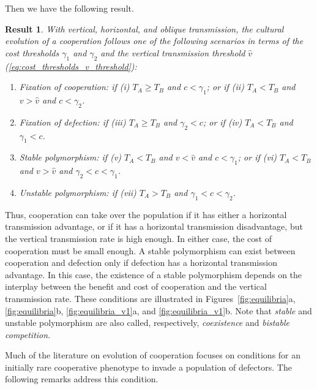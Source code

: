 \documentclass[12pt]{extarticle}
\newtheorem{result}{Result}
\begin{document}
Then we have the following result.
\\

\begin{result}%
\label{result:vert_obli_hori}
With vertical, horizontal, and oblique transmission, the cultural evolution of a cooperation follows one of the following scenarios in terms of the cost thresholds $\gamma_1$ and $\gamma_2$ and the vertical transmission threshold $\hat v$ (\autoref{eq:cost_thresholds_v_threshold}):

\begin{enumerate}
\item \emph{Fixation of cooperation}: 
	if \emph{(i)} $T_A \ge T_B$ and $c < \gamma_1$; or 
	if \emph{(ii)} $T_A < T_B$ and $v>\hat v$ and $c < \gamma_2$.
\item \emph{Fixation of defection}: 
    if \emph{(iii)} $T_A \ge T_B$ and $\gamma_2 < c$; or 
	if \emph{(iv)} $T_A < T_B$ and $\gamma_1 < c$.
\item \emph{Stable polymorphism}: 
    if \emph{(v)} $T_A < T_B$ and $v<\hat{v}$ and $c < \gamma_1$; or 
    if \emph{(vi)} $T_A < T_B$ and $v>\hat{v}$ and $\gamma_2 < c < \gamma_1$.
\item \emph{Unstable polymorphism}:
    if \emph{(vii)} $T_A > T_B$ and $\gamma_1 < c < \gamma_2$.
\end{enumerate}

\end{result}
Thus, cooperation can take over the population if it has either a horizontal transmission advantage, or if it has a horizontal transmission disadvantage, but the vertical transmission rate is high enough.
In either case, the cost of cooperation must be small enough.
A stable polymorphism can exist between cooperation and defection only if defection has a horizontal transmission advantage.
In this case, the existence of a stable polymorphism depends on the interplay between the benefit and cost of cooperation and the vertical transmission rate.
These conditions are illustrated in Figures~\ref{fig:equilibria}a, \ref{fig:equilibria}b, \ref{fig:equilibria_v1}a, and \ref{fig:equilibria_v1}b.
Note that \emph{stable} and {unstable polymorphism} are also called, respectively, \emph{coexistence} and \emph{bistable competition}.

Much of the literature on evolution of cooperation focuses on conditions for  an initially rare cooperative phenotype to invade a population of defectors.
The following remarks address this condition.
\\
\end{document}
